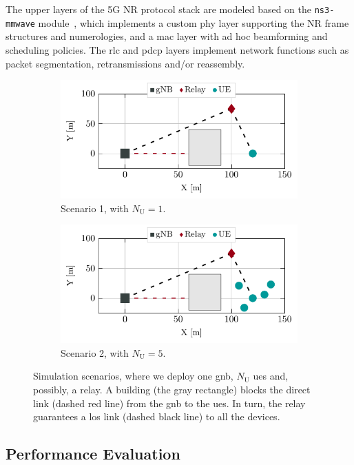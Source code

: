 The upper layers of the 5G NR protocol stack are modeled based on the \texttt{ns3-mmwave} module~\cite{mezzavilla2018end}, which implements a custom \gls{phy} layer supporting the NR frame structures and numerologies, and a \gls{mac} layer with ad hoc beamforming and scheduling policies. 
The \gls{rlc} and \gls{pdcp} layers implement network functions such as packet segmentation, retransmissions and/or reassembly. 
\begin{figure}[t!]
  \centering
    \begin{subfigure}[t]{\columnwidth}
    \centering
    \includegraphics[width=0.6\columnwidth]{Figures/IrsSimulation/Scenario1.pdf}
    \caption{Scenario 1, with $N_{\mathrm U} = 1$.}
    \label{Fig:s1}
    \end{subfigure}
    \begin{subfigure}[t]{\columnwidth}
      \centering
    \includegraphics[width=0.6\columnwidth]{Figures/IrsSimulation/Scenario2.pdf}
    \caption{Scenario 2, with $N_{\mathrm U} = 5$.}
    \label{Fig:s2}
    \end{subfigure}
     \caption{Simulation scenarios, where we deploy one \gls{gnb}, $N_{\mathrm U}$ \glspl{ue} and, possibly, a relay. A building (the gray rectangle) blocks the direct link (dashed red line) from the \gls{gnb} to the \glspl{ue}. In turn, the relay guarantees a \gls{los} link (dashed black line) to all the devices.}
    \label{Fig:scenarios}
\end{figure}

\subsection{Performance Evaluation}
\label{sec:results}

